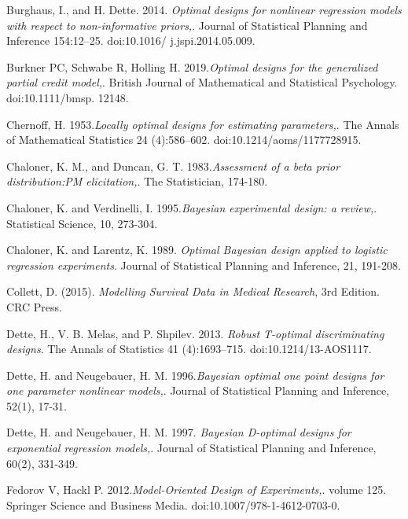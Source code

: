 \documentclass[twoside]{article}
\begin{document}
Burghaus, I., and H. Dette. 2014. {\it Optimal designs for nonlinear regression models with respect to non-informative priors,}. Journal of Statistical Planning and Inference 154:12–25. doi:10.1016/ j.jspi.2014.05.009.

Burkner PC, Schwabe R, Holling H. 2019.{\it Optimal designs for the generalized partial credit model,}. British Journal of Mathematical and Statistical Psychology. doi:10.1111/bmsp. 12148.


Chernoff, H. 1953.{\it  Locally optimal designs for estimating parameters,}. The Annals of Mathematical Statistics 24 (4):586–602. doi:10.1214/aoms/1177728915.




Chaloner, K. M., and Duncan, G. T. 1983.{\it Assessment of a beta prior distribution:PM elicitation,}. The Statistician, 174-180.


Chaloner, K. and Verdinelli, I. 1995.{\it Bayesian experimental design: a review,}. Statistical Science, 10, 273-304.

Chaloner, K. and Larentz, K. 1989. {\it Optimal Bayesian design applied to logistic regression experiments}. Journal of Statistical Planning and Inference, 21, 191-208.


 Collett, D. (2015). {\it Modelling Survival Data in Medical Research}, 3rd Edition. CRC Press.



Dette, H., V. B. Melas, and P. Shpilev. 2013. {\it Robust T-optimal discriminating designs}. The Annals of Statistics 41 (4):1693–715. doi:10.1214/13-AOS1117.


Dette, H. and Neugebauer, H. M. 1996.{\it Bayesian optimal one point designs for one parameter nonlinear models,}. Journal of Statistical Planning and Inference, 52(1), 17-31.


Dette, H. and Neugebauer, H. M. 1997. {\it Bayesian D-optimal designs for exponential regression models,}. Journal of Statistical Planning and Inference, 60(2), 331-349.


Fedorov V, Hackl P. 2012.{\it Model-Oriented Design of Experiments,}. volume 125. Springer Science and Business Media. doi:10.1007/978-1-4612-0703-0.
\end{document}
